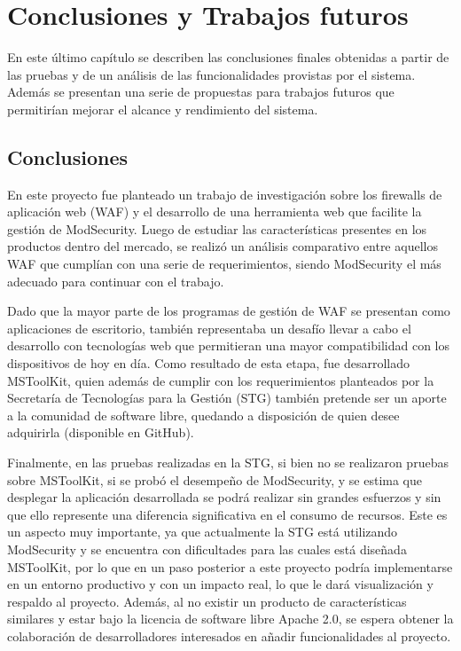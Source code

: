 \chapter{Conclusiones y Trabajos futuros}
\par
En este último capítulo se describen las conclusiones finales obtenidas a partir de las pruebas y de un análisis de las funcionalidades provistas por el sistema. Además se presentan una serie de propuestas para trabajos futuros que permitirían mejorar el alcance y rendimiento del sistema.

\section{Conclusiones}
En este proyecto fue planteado un trabajo de investigación sobre los firewalls de aplicación web (WAF) y el desarrollo de una herramienta web que facilite la gestión de ModSecurity. Luego de estudiar las características presentes en los productos dentro del mercado, se realizó un análisis comparativo entre aquellos WAF que cumplían con una serie de requerimientos, siendo ModSecurity el más adecuado para continuar con el trabajo.

\par
Dado que la mayor parte de los programas de gestión de WAF se presentan como aplicaciones de escritorio, también representaba un desafío llevar a cabo el desarrollo con tecnologías web que permitieran una mayor compatibilidad con los dispositivos de hoy en día. Como resultado de esta etapa, fue desarrollado MSToolKit, quien además de cumplir con los requerimientos planteados por la Secretaría de Tecnologías para la Gestión (STG) también pretende ser un aporte a la comunidad de software libre, quedando a disposición de quien desee adquirirla (disponible en GitHub).
\par
Finalmente, en las pruebas realizadas en la STG, si bien no se realizaron pruebas sobre MSToolKit, si se probó el desempeño de ModSecurity, y se estima que desplegar la aplicación desarrollada se podrá realizar sin grandes esfuerzos y sin que ello represente una diferencia significativa en el consumo de recursos. Este es un aspecto muy importante, ya que actualmente la STG está utilizando ModSecurity y se encuentra con dificultades para las cuales está diseñada MSToolKit, por lo que en un paso posterior a este proyecto podría implementarse en un entorno productivo y con un impacto real, lo que le dará visualización y respaldo al proyecto. Además, al no existir un producto de características similares y estar bajo la licencia de software libre Apache 2.0, se espera obtener la colaboración de desarrolladores interesados en añadir funcionalidades al proyecto.

